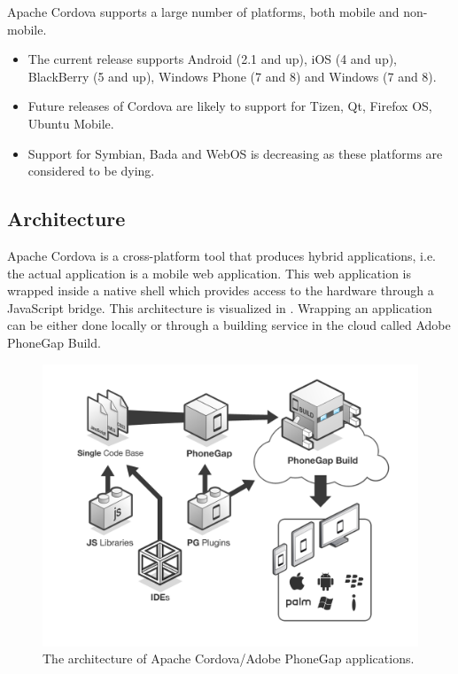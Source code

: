 Apache Cordova supports a large number of platforms, both mobile and non-mobile.
\begin{itemize}
    \item The current release supports Android (2.1 and up), iOS (4 and up), BlackBerry (5 and up), Windows Phone (7 and 8) and Windows (7 and 8). 
    \item Future releases of Cordova are likely to support for Tizen, Qt, Firefox OS, Ubuntu Mobile.
    \item Support for Symbian, Bada and WebOS is decreasing as these platforms are considered to be dying. 
\end{itemize}

\subsection{Architecture}
\label{sec:cordova:architecture}

Apache Cordova is a cross-platform tool that produces hybrid applications, i.e. the actual application is a mobile web application. This web application is wrapped inside a native shell which provides access to the hardware through a JavaScript bridge. This architecture is visualized in . Wrapping an application can be either done locally or through a building service in the cloud called Adobe PhoneGap Build.

\begin{figure}
    \begin{center}
        \includegraphics[width=.8\textwidth]{figs/cordova-architecture.png}
        \caption{The architecture of Apache Cordova/Adobe PhoneGap applications.}
        \label{fig:cordova:architecture}
    \end{center}
\end{figure}

